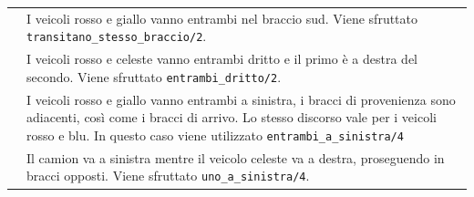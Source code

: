 \begin{center}
	\begin{longtabu} to \textwidth {lX}
		 & I veicoli rosso e giallo vanno entrambi nel braccio sud. Viene sfruttato \texttt{transitano\_stesso\_braccio/2}.\\
		
		 & I veicoli rosso e celeste vanno entrambi dritto e il primo è a destra del secondo. Viene sfruttato \texttt{entrambi\_dritto/2}.\\
		
		 & I veicoli rosso e giallo vanno entrambi a sinistra, i bracci di provenienza sono adiacenti, così come i bracci di arrivo.   Lo stesso discorso vale per i veicoli rosso e blu. In questo caso viene utilizzato \texttt{entrambi\_a\_sinistra/4}\\
		
		 & Il camion va a sinistra mentre il veicolo celeste va a destra, proseguendo in bracci opposti. Viene sfruttato \texttt{uno\_a\_sinistra/4}. \\
		

\end{longtabu}
\end{center}
